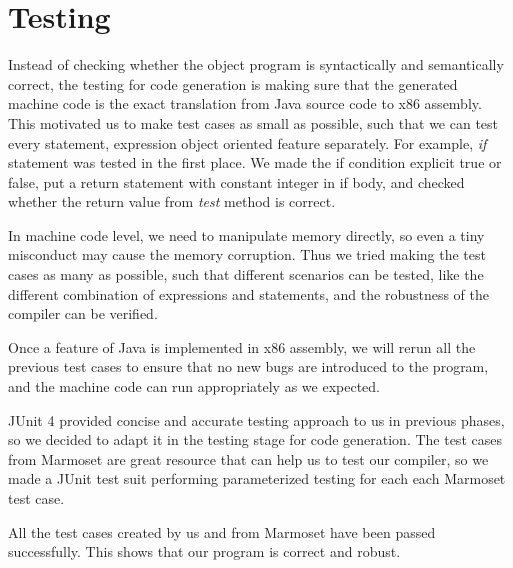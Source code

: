 \chapter{Testing}
\label{testing}
Instead of checking whether the object program is syntactically and semantically correct, the testing for code generation is making sure that the generated machine code is the exact translation from Java source code to x86 assembly. This motivated us to make test cases as small as possible, such that we can test every statement, expression object oriented feature separately. For example, \textit{if} statement was tested in the first place. We made the if condition explicit true or false, put a return statement with constant integer in if body, and checked whether the return value from \textit{test} method is correct.

In machine code level, we need to manipulate memory directly, so even a tiny misconduct may cause the memory corruption. Thus we tried making the test cases as many as possible, such that different scenarios can be tested, like the different combination of expressions and statements, and the robustness of the compiler can be verified.     

Once a feature of Java is implemented in x86 assembly, we will rerun all the previous test cases to ensure that no new bugs are introduced to the program, and the machine code can run appropriately as we expected. 

JUnit 4 provided concise and accurate testing approach to us in previous phases, so we decided to adapt it in the testing stage for code generation. The test cases from Marmoset are great resource that can help us to test our compiler, so we made a JUnit test suit performing parameterized testing for each each Marmoset test case.

All the test cases created by us and from Marmoset have been passed successfully. This shows that our program is correct and robust. 